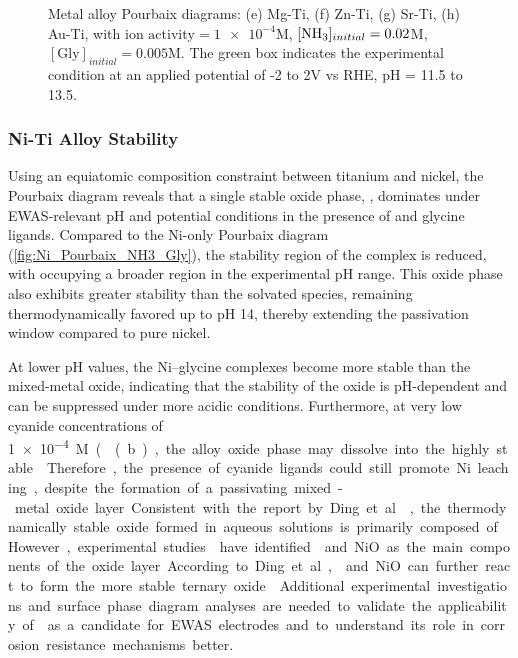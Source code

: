 \documentclass[journal=jacsat,manuscript=article]{achemso}
\begin{document}
\begin{figure}[htbp]
\centering
{}
\caption{Metal alloy Pourbaix diagrams: (e) Mg-Ti, (f) Zn-Ti, (g) Sr-Ti, (h) Au-Ti, with $\text{ion activity}=\num{1e-4}$M, $[\ce{NH3}]_{initial}= 0.02$M, $[\text{Gly}]_{initial}=0.005$M. The green box indicates the experimental condition at an applied potential of -2 to 2V vs RHE, pH = 11.5 to 13.5.}
\label{fig:alloy_pourbaix_collage_2}
\end{figure}

\subsubsection{Ni-Ti Alloy Stability}
Using an equiatomic composition constraint between titanium and nickel, the Pourbaix diagram reveals that a single stable oxide phase, , dominates under EWAS-relevant pH and potential conditions in the presence of  and glycine ligands. Compared to the Ni-only Pourbaix diagram (\ref{fig:Ni_Pourbaix_NH3_Gly}), the stability region of the  complex is reduced, with  occupying a broader region in the experimental pH range. This oxide phase also exhibits greater stability than the solvated  species, remaining thermodynamically favored up to pH 14, thereby extending the passivation window compared to pure nickel. 

At lower pH values, the Ni–glycine complexes become more stable than the mixed-metal oxide, indicating that the stability of the oxide is pH-dependent and can be suppressed under more acidic conditions. Furthermore, at very low cyanide concentrations of \SI{1e-4}M ((b), the alloy oxide phase may dissolve into the highly stable . Therefore, the presence of cyanide ligands could still promote Ni leaching, despite the formation of a passivating mixed-metal oxide layer.

Consistent with the report by Ding et al. \cite{Ding2018ElectrochemicalStates}, the thermodynamically stable oxide formed in aqueous solutions is primarily composed of . However, experimental studies \cite{Huang2005SurfaceAcidity, Clarke2006InfluenceRelease, Carroll2003CorrosionEnvironments} have identified  and NiO as the main components of the oxide layer. According to Ding et al.,  and NiO can further react to form the more stable ternary oxide . Additional experimental investigations and surface phase diagram analyses are needed to validate the applicability of  as a candidate for EWAS electrodes and to understand its role in corrosion resistance mechanisms better.
\end{document}
